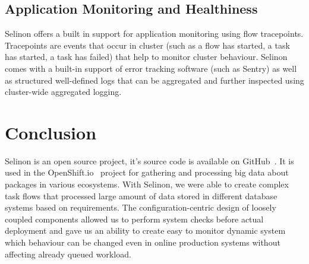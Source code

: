 \documentclass[a4paper]{llncs}
\begin{document}
\subsection{Application Monitoring and Healthiness}

Selinon offers a built in support for application monitoring using flow tracepoints. Tracepoints are events that occur in cluster (such as a flow has started, a task has started, a task has failed) that help to monitor cluster behaviour. Selinon comes with a built-in support of error tracking software (such as Sentry) as well as structured well-defined logs that can be aggregated and further inspected using cluster-wide aggregated logging.

\section{Conclusion}


Selinon is an open source project, it's source code is available on GitHub~\cite{ref_celery}. It is used in the OpenShift.io~\cite{ref_openshift_io} project for gathering and processing big data about packages in various ecosystems. With Selinon, we were able to create complex task flows that processed large amount of data stored in different database systems based on requirements. The configuration-centric design of loosely coupled components allowed us to perform system checks before actual deployment and gave us an ability to create easy to monitor dynamic system which behaviour can be changed even in online production systems without affecting already queued workload.
\end{document}
